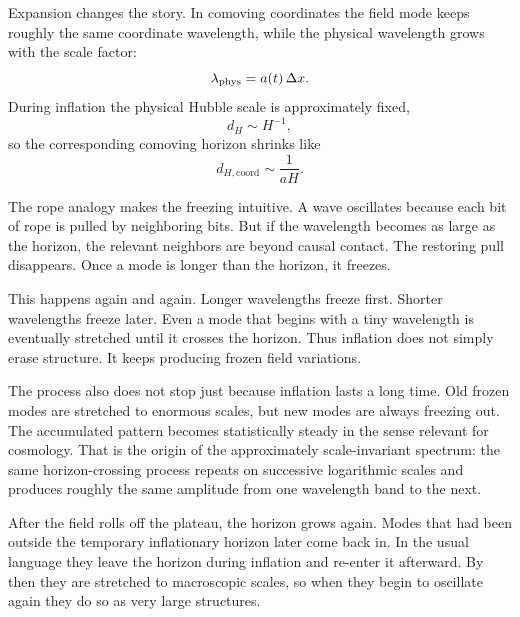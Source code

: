 Expansion changes the story. In comoving coordinates the field mode keeps roughly the same coordinate wavelength, while the physical wavelength grows with the scale factor:
\begin{equation}
\lambda_{\rm phys}=a(t)\,\Delta x.
\end{equation}
During inflation the physical Hubble scale is approximately fixed,
\begin{equation}
d_H\sim H^{-1},
\end{equation}
so the corresponding comoving horizon shrinks like
\begin{equation}
d_{H,\mathrm{coord}}\sim \frac{1}{aH}.
\end{equation}

The rope analogy makes the freezing intuitive. A wave oscillates because each bit of rope is pulled by neighboring bits. But if the wavelength becomes as large as the horizon, the relevant neighbors are beyond causal contact. The restoring pull disappears. Once a mode is longer than the horizon, it freezes.

This happens again and again. Longer wavelengths freeze first. Shorter wavelengths freeze later. Even a mode that begins with a tiny wavelength is eventually stretched until it crosses the horizon. Thus inflation does not simply erase structure. It keeps producing frozen field variations.

The process also does not stop just because inflation lasts a long time. Old frozen modes are stretched to enormous scales, but new modes are always freezing out. The accumulated pattern becomes statistically steady in the sense relevant for cosmology. That is the origin of the approximately scale-invariant spectrum: the same horizon-crossing process repeats on successive logarithmic scales and produces roughly the same amplitude from one wavelength band to the next.

After the field rolls off the plateau, the horizon grows again. Modes that had been outside the temporary inflationary horizon later come back in. In the usual language they leave the horizon during inflation and re-enter it afterward. By then they are stretched to macroscopic scales, so when they begin to oscillate again they do so as very large structures.

\begin{classroomqa}
\end{classroomqa}

